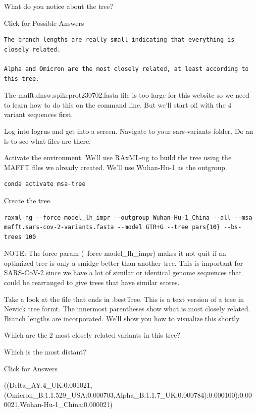 \documentclass[
]{book}
\begin{document}
\hfill\break

What do you notice about the tree?

Click for Possible Answers

\begin{verbatim}
The branch lengths are really small indicating that everything is closely related.

Alpha and Omicron are the most closely related, at least according to this tree.
\end{verbatim}

\hfill\break

The mafft.dnsw.spikeprot230702.fasta file is too large for this website so we need to learn how to do this on the command line. But we'll start off with the 4 variant sequences first.

Log into logrus and get into a screen. Navigate to your sars-variants folder. Do an ls to see what files are there.

Activate the environment. We'll use RAxML-ng to build the tree using the MAFFT files we already created. We'll use Wuhan-Hu-1 as the outgroup.

\begin{verbatim}
conda activate msa-tree
\end{verbatim}

Create the tree.

\begin{verbatim}
raxml-ng --force model_lh_impr --outgroup Wuhan-Hu-1_China --all --msa mafft.sars-cov-2-variants.fasta --model GTR+G --tree pars{10} --bs-trees 100
\end{verbatim}

NOTE: The force param (--force model\_lh\_impr) makes it not quit if an optimized tree is only a smidge better than another tree. This is important for SARS-CoV-2 since we have a lot of similar or identical genome sequences that could be rearranged to give trees that have similar scores.

Take a look at the file that ends in .bestTree. This is a text version of a tree in Newick tree formt. The innermost parentheses show what is most closely related. Branch lengths are incorporated. We'll show you how to visualize this shortly.

Which are the 2 most closely related variants in this tree?

Which is the most distant?

Click for Answers

((Delta\_AY.4\_UK:0.001021,(Omicron\_B.1.1.529\_USA:0.000703,Alpha\_B.1.1.7\_UK:0.000784):0.000100):0.000021,Wuhan-Hu-1\_China:0.000021)
\end{document}
